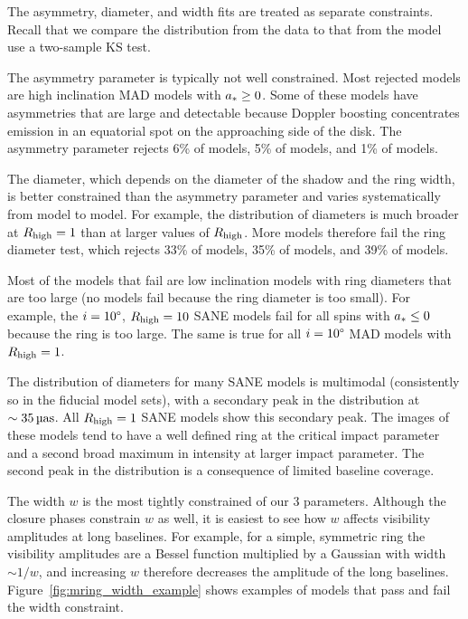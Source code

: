 The \mring asymmetry, diameter, and width fits are treated as separate constraints.
Recall that we compare the distribution from the data to that from the model use a two-sample KS test.

The asymmetry parameter is typically not well constrained.
Most rejected models are high inclination MAD models with $a_* \ge 0$.
Some of these models have asymmetries that are large and detectable because Doppler boosting concentrates emission in an equatorial spot on the approaching side of the disk.
The asymmetry parameter rejects 6\% of \kharma models, 5\% of \bhac models, and 1\% of \hamr models.

The \mring diameter, which depends on the diameter of the shadow and the ring width, is better constrained than the asymmetry parameter and varies systematically from model to model.
For example, the distribution of diameters is much broader at $R_\mathrm{high} = 1$ than at larger values of $R_\mathrm{high}$.
More models therefore fail the ring diameter test, which rejects 33\% of \kharma models, 35\% of \bhac models, and 39\% of \hamr models.

Most of the models that fail are low inclination models with ring diameters that are too large (no models fail because the ring diameter is too small).
For example, the $i = 10\degree$, $R_\mathrm{high} = 10$ SANE models fail for all spins with $a_* \le 0$ because the ring is too large.
The same is true for all $i = 10\degree$ MAD models with $R_\mathrm{high} = 1$.

The distribution of \mring diameters for many SANE models is multimodal (consistently so in the fiducial model sets), with a secondary peak in the distribution at $\sim 35\uas$.
All $R_\mathrm{high} = 1$ SANE models show this secondary peak.
The images of these models tend to have a well defined ring at the critical impact parameter and a second broad maximum in intensity at larger impact parameter.
The second peak in the distribution is a consequence of limited baseline coverage.

The \mring width $w$ is the most tightly constrained of our 3 parameters.
Although the closure phases constrain $w$ as well, it is easiest to see how $w$ affects visibility amplitudes at long baselines.
For example, for a simple, symmetric ring the visibility amplitudes are a Bessel function multiplied by a Gaussian with width $\sim 1/w$, and increasing $w$ therefore decreases the amplitude of the long baselines.
Figure~\ref{fig:mring_width_example} shows examples of models that pass and fail the \mring width constraint.


